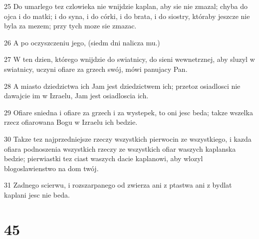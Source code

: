 \par 25 Do umarlego tez czlowieka nie wnijdzie kaplan, aby sie nie zmazal; chyba do ojca i do matki; i do syna, i do córki, i do brata, i do siostry, któraby jeszcze nie byla za mezem; przy tych moze sie zmazac.
\par 26 A po oczyszczeniu jego, (siedm dni nalicza mu.)
\par 27 W ten dzien, którego wnijdzie do swiatnicy, do sieni wewnetrznej, aby sluzyl w swiatnicy, uczyni ofiare za grzech swój, mówi panujacy Pan.
\par 28 A miasto dziedzictwa ich Jam jest dziedzictwem ich; przetoz osiadlosci nie dawajcie im w Izraelu, Jam jest osiadloscia ich.
\par 29 Ofiare sniedna i ofiare za grzech i za wystepek, to oni jesc beda; takze wszelka rzecz ofiarowana Bogu w Izraelu ich bedzie.
\par 30 Takze tez najprzedniejsze rzeczy wszystkich pierwocin ze wszystkiego, i kazda ofiara podnoszenia wszystkich rzeczy ze wszystkich ofiar waszych kaplanska bedzie; pierwiastki tez ciast waszych dacie kaplanowi, aby wlozyl blogoslawienstwo na dom twój.
\par 31 Zadnego scierwu, i rozszarpanego od zwierza ani z ptastwa ani z bydlat kaplani jesc nie beda.

\chapter{45}

